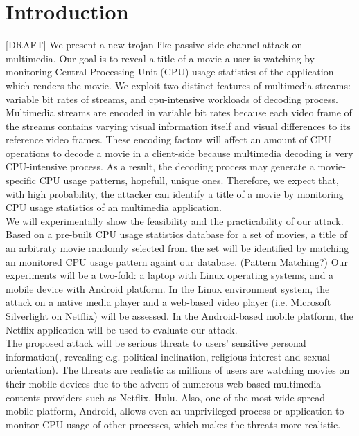 \section{Introduction}
\label{sec:introduction}
[DRAFT] We present a new trojan-like passive side-channel attack on multimedia. Our goal is to reveal a title of a movie a user is watching by monitoring Central Processing Unit (CPU) usage statistics of the application which renders the movie. We exploit two distinct features of multimedia streams: variable bit rates of streams, and cpu-intensive workloads of decoding process. Multimedia streams are encoded in variable bit rates because each video frame of the streams contains varying visual information itself and visual differences to its reference video frames. These encoding factors will affect an amount of CPU operations to decode a movie in a client-side because multimedia decoding is very CPU-intensive process. As a result, the decoding process may generate a movie-specific CPU usage patterns, hopefull, unique ones. Therefore, we expect that, with high probability, the attacker can identify a title of a movie by monitoring CPU usage statistics of an multimedia application.\\
\indent We will experimentally show the feasibility and the practicability of our attack. Based on a pre-built CPU usage statistics database for a set of movies, a title of an arbitraty movie randomly selected from the set will be identified by matching an monitored CPU usage pattern againt our database. (Pattern Matching?)  Our experiments will be a two-fold: a laptop with Linux operating systems, and a mobile device with Android platform. In the Linux environment system, the attack on a native media player and a web-based video player (i.e. Microsoft Silverlight on Netflix) will be assessed. In the Android-based mobile platform, the Netflix application will be used to evaluate our attack.\\
\indent The proposed attack will be serious threats to users' sensitive personal information(, revealing e.g. political inclination, religious interest and sexual orientation). The threats are realistic as millions of users are watching movies on their mobile devices due to the advent of numerous web-based multimedia contents providers such as Netflix, Hulu. Also, one of the most wide-spread mobile platform, Android, allows even an unprivileged process or application to monitor CPU usage of other processes, which makes the threats more realistic. 

